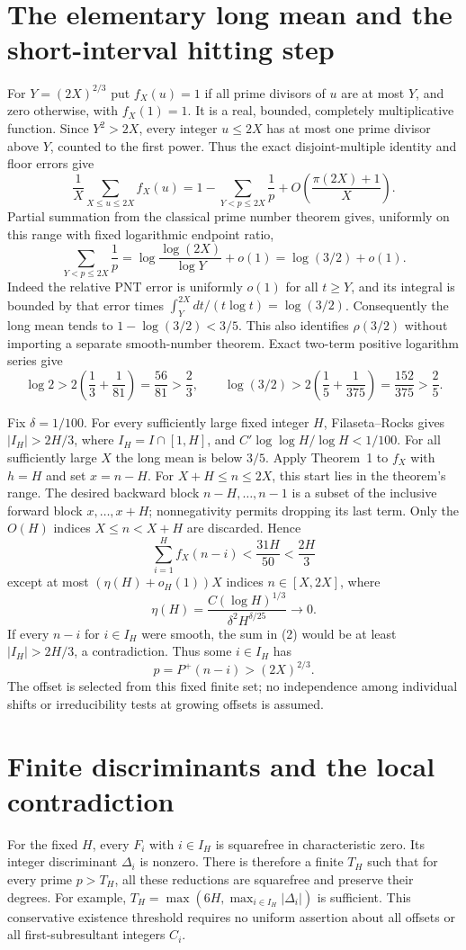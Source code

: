 \documentclass[11pt]{article}
\begin{document}
\section{The elementary long mean and the short-interval hitting step}
For $Y=(2X)^{2/3}$ put $f_X(u)=1$ if all prime divisors of $u$ are at
most $Y$, and zero otherwise, with $f_X(1)=1$.
It is a real, bounded, completely multiplicative function.
Since $Y^2>2X$, every integer $u\le2X$ has at most one prime divisor
above $Y$, counted to the first power. Thus the exact disjoint-multiple
identity and floor errors give
\[
 \frac1X\sum_{X\le u\le2X}f_X(u)
 =1-\sum_{Y<p\le2X}\frac1p+O\left(\frac{\pi(2X)+1}{X}\right).
\]
Partial summation from the classical prime number theorem gives, uniformly
on this range with fixed logarithmic endpoint ratio,
\[
 \sum_{Y<p\le2X}\frac1p
 =\log\frac{\log(2X)}{\log Y}+o(1)=\log(3/2)+o(1).
\]
Indeed the relative PNT error is uniformly $o(1)$ for all $t\ge Y$,
and its integral is bounded by that error times
$\int_Y^{2X}dt/(t\log t)=\log(3/2)$.
Consequently the long mean tends to $1-\log(3/2)<3/5$.
This also identifies $\rho(3/2)$ without importing a separate smooth-number
theorem. Exact two-term positive logarithm series give
\[
 \log2>2\left(\frac13+\frac1{81}\right)=\frac{56}{81}>\frac23,
 \qquad
 \log(3/2)>2\left(\frac15+\frac1{375}\right)
 =\frac{152}{375}>\frac25.
\]

Fix $\delta=1/100$. For every sufficiently large fixed integer $H$,
Filaseta--Rocks gives $|I_H|>2H/3$, where $I_H=I\cap[1,H]$, and
$C'\log\log H/\log H<1/100$.
For all sufficiently large $X$ the long mean is below $3/5$.
Apply Theorem~1 to $f_X$ with $h=H$ and set $x=n-H$.
For $X+H\le n\le2X$, this start lies in the theorem's range.
The desired backward block $n-H,\ldots,n-1$ is a subset of the inclusive
forward block $x,\ldots,x+H$; nonnegativity permits dropping its last term.
Only the $O(H)$ indices $X\le n<X+H$ are discarded. Hence
\[
 \sum_{i=1}^H f_X(n-i)<\frac{31H}{50}<\frac{2H}{3} \tag{2}
\]
except at most $(\eta(H)+o_H(1))X$ indices $n\in[X,2X]$, where
\[
 \eta(H)=\frac{C(\log H)^{1/3}}{\delta^2H^{\delta/25}}
 \longrightarrow0.
\]
If every $n-i$ for $i\in I_H$ were smooth, the sum in (2) would be
at least $|I_H|>2H/3$, a contradiction. Thus some $i\in I_H$ has
\[
 p=P^+(n-i)>(2X)^{2/3}. \tag{3}
\]
The offset is selected from this fixed finite set; no independence among
individual shifts or irreducibility tests at growing offsets is assumed.

\section{Finite discriminants and the local contradiction}
For the fixed $H$, every $F_i$ with $i\in I_H$ is squarefree in
characteristic zero. Its integer discriminant $\Delta_i$ is nonzero.
There is therefore a finite $T_H$ such that for every prime
$p>T_H$, all these reductions are squarefree and preserve their degrees.
For example, $T_H=\max(6H,\max_{i\in I_H}|\Delta_i|)$ is sufficient.
This conservative existence threshold requires no uniform assertion about
all offsets or all first-subresultant integers $C_i$.
\end{document}
